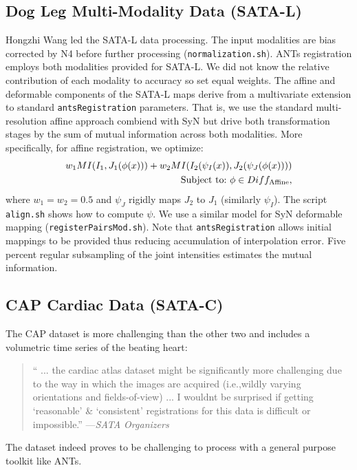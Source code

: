 \documentclass{llncs}
\begin{document}
\subsection{Dog Leg Multi-Modality Data (SATA-L)}
Hongzhi Wang led the SATA-L data processing.  The input modalities are
bias corrected by N4 \cite{} before further processing (\texttt{normalization.sh}).  ANTs
registration employs both modalities provided for SATA-L.  We did not
know the relative contribution of each modality to accuracy so set
equal weights.  The affine and deformable components of the SATA-L
maps derive from a multivariate extension to standard
\texttt{antsRegistration} parameters.  That is, we use the standard
multi-resolution affine approach combiend with SyN but drive both
transformation stages by the sum of mutual information across both
modalities.  More specifically, for affine registration, we optimize:
\begin{eqnarray}
w_1 MI(  I_1 , J_1( \phi(x) ) ) +
w_2 MI(  I_2(\psi_I(x)) , J_2( \psi_J(\phi(x)) ) ) \notag \\ 
\text{Subject to:}~\phi \in Diff_\text{Affine},
\end{eqnarray}
where $w_1=w_2=0.5$ and $\psi_J$ rigidly maps $J_2$ to $J_1$
(similarly $\psi_I$).  The script \texttt{align.sh} shows how to
compute $\psi$.  We use a similar model for SyN deformable mapping (\texttt{registerPairsMod.sh}).  Note that
\texttt{antsRegistration} allows initial mappings to be provided thus
reducing accumulation of interpolation error.  Five percent regular
subsampling of the joint intensities estimates the mutual information.

\subsection{CAP Cardiac Data (SATA-C)}
The CAP dataset is more challenging than the other two and includes a volumetric time series of the beating heart:

 \begin{quote}
  `` ... the cardiac atlas dataset
  might be significantly more challenging due to the way in which the
  images are acquired (i.e.,wildly varying orientations and
  fields-of-view) ... I wouldnt be surprised if getting `reasonable' \& `consistent' registrations for this data is difficult or impossible.'' ---{\em SATA Organizers}
\end{quote}
 
\noindent The dataset indeed proves to be challenging to process with
a general purpose toolkit like ANTs.  
\end{document}
